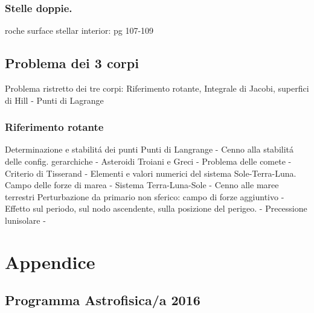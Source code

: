 \section{Stelle doppie.}
\begin{todo}{roche surface}
stellar interior: pg 107-109
\end{todo}


\chapter{Problema dei 3 corpi}


Problema ristretto dei tre corpi: Riferimento rotante, Integrale di Jacobi, superfici di Hill - Punti di Lagrange 
\PartialToc

\section{Riferimento rotante}

Determinazione e stabilit\'a dei punti Punti di Langrange - Cenno alla stabilit\'a delle config. gerarchiche - Asteroidi Troiani e Greci - Problema delle comete - Criterio di Tisserand - Elementi e valori numerici del sistema Sole-Terra-Luna.
Campo delle forze di marea - Sistema Terra-Luna-Sole - Cenno alle maree terrestri
Perturbazione da primario non sferico: campo di forze aggiuntivo - Effetto sul periodo, sul nodo ascendente, sulla posizione del perigeo. - Precessione lunisolare - 


\stopcontents[chapters]


\backmatter

\part{Appendice}

\chapter{Programma Astrofisica/a 2016}

